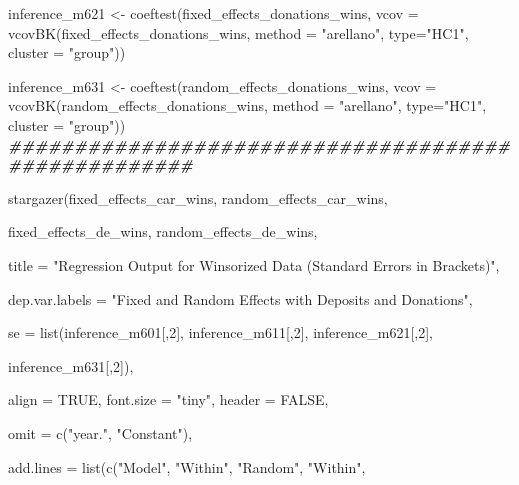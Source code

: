 \documentclass[a4paper,nobind]{templates/ociamthesis}
\newenvironment{Shaded}{\begin{snugshade}}{\end{snugshade}}
\newcommand{\AttributeTok}[1]{\textcolor[rgb]{0.77,0.63,0.00}{#1}}
\newcommand{\ConstantTok}[1]{\textcolor[rgb]{0.00,0.00,0.00}{#1}}
\newcommand{\DecValTok}[1]{\textcolor[rgb]{0.00,0.00,0.81}{#1}}
\newcommand{\DocumentationTok}[1]{\textcolor[rgb]{0.56,0.35,0.01}{\textbf{\textit{#1}}}}
\newcommand{\FunctionTok}[1]{\textcolor[rgb]{0.00,0.00,0.00}{#1}}
\newcommand{\NormalTok}[1]{#1}
\newcommand{\OtherTok}[1]{\textcolor[rgb]{0.56,0.35,0.01}{#1}}
\newcommand{\StringTok}[1]{\textcolor[rgb]{0.31,0.60,0.02}{#1}}
\renewenvironment{Shaded}
{
  \vspace{10pt}%
  \begin{snugshade}%
}{%
  \end{snugshade}%
  \vspace{8pt}%
}
\begin{document}
\begin{landscape}
\begin{Shaded}
\begin{Highlighting}[]
\NormalTok{inference\_m621 }\OtherTok{\textless{}{-}} \FunctionTok{coeftest}\NormalTok{(fixed\_effects\_donations\_wins, }\AttributeTok{vcov =} \FunctionTok{vcovBK}\NormalTok{(fixed\_effects\_donations\_wins, }\AttributeTok{method =} \StringTok{"arellano"}\NormalTok{, }\AttributeTok{type=}\StringTok{"HC1"}\NormalTok{, }\AttributeTok{cluster =} \StringTok{"group"}\NormalTok{))}

\NormalTok{inference\_m631 }\OtherTok{\textless{}{-}} \FunctionTok{coeftest}\NormalTok{(random\_effects\_donations\_wins, }\AttributeTok{vcov =} \FunctionTok{vcovBK}\NormalTok{(random\_effects\_donations\_wins, }\AttributeTok{method =} \StringTok{"arellano"}\NormalTok{, }\AttributeTok{type=}\StringTok{"HC1"}\NormalTok{, }\AttributeTok{cluster =} \StringTok{"group"}\NormalTok{))}
\DocumentationTok{\#\#\#\#\#\#\#\#\#\#\#\#\#\#\#\#\#\#\#\#\#\#\#\#\#\#\#\#\#\#\#\#\#\#\#\#\#\#\#\#\#\#\#\#\#\#\#\#\#\#\#\#}


\FunctionTok{stargazer}\NormalTok{(fixed\_effects\_car\_wins, random\_effects\_car\_wins, }
          
\NormalTok{          fixed\_effects\_de\_wins, random\_effects\_de\_wins,}
          
          \AttributeTok{title =} \StringTok{"Regression Output for Winsorized Data (Standard Errors in Brackets)"}\NormalTok{, }
          
          \AttributeTok{dep.var.labels =} \StringTok{"Fixed and Random Effects with Deposits and Donations"}\NormalTok{,}
          
          \AttributeTok{se =} \FunctionTok{list}\NormalTok{(inference\_m601[,}\DecValTok{2}\NormalTok{], inference\_m611[,}\DecValTok{2}\NormalTok{], inference\_m621[,}\DecValTok{2}\NormalTok{], }
          
\NormalTok{          inference\_m631[,}\DecValTok{2}\NormalTok{]),}
          
          \AttributeTok{align =} \ConstantTok{TRUE}\NormalTok{, }\AttributeTok{font.size =} \StringTok{"tiny"}\NormalTok{, }\AttributeTok{header =} \ConstantTok{FALSE}\NormalTok{, }
          
          \AttributeTok{omit =} \FunctionTok{c}\NormalTok{(}\StringTok{"year."}\NormalTok{, }\StringTok{"Constant"}\NormalTok{),}
          
          \AttributeTok{add.lines =} \FunctionTok{list}\NormalTok{(}\FunctionTok{c}\NormalTok{(}\StringTok{"Model"}\NormalTok{, }\StringTok{"Within"}\NormalTok{, }\StringTok{"Random"}\NormalTok{, }\StringTok{"Within"}\NormalTok{, }
                        

\end{Highlighting}
\end{Shaded}
\end{landscape}
\end{document}
